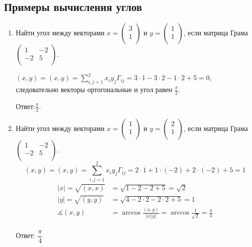 \documentclass[12pt]{article}
\begin{document}
\subsection{Примеры вычисления углов}
\begin{enumerate}
    \item Найти угол между векторами $x = \begin{pmatrix}
                  3 \\
                  1 \\
              \end{pmatrix}$ и $y= \begin{pmatrix}
                  1 \\
                  1 \\
              \end{pmatrix}$, если матрица Грама $\begin{pmatrix}
                  1  & -2 \\
                  -2 & 5  \\
              \end{pmatrix}$.

          $(x,y)=(x,y)=\sum\limits_{i,j=1}^2 x_iy_j\Gamma_{ij} = 3\cdot1 - 3\cdot2-1\cdot2+5=0$,
          следовательно векторы ортогональные и угол равен $\frac{\pi}{2}$.

          Ответ:$\frac{\pi}{2}$.
    \item Найти угол между векторами $x = \begin{pmatrix}
                  1 \\
                  1 \\
              \end{pmatrix}$ и $y= \begin{pmatrix}
                  2 \\
                  1 \\
              \end{pmatrix}$, если матрица Грама $\begin{pmatrix}
                  1  & -2 \\
                  -2 & 5  \\
              \end{pmatrix}$.
          \[
              (x,y)=(x,y)=\sum\limits_{i,j=1}^2 x_iy_j\Gamma_{ij} = 2\cdot1 + 1\cdot(-2)+2\cdot(-2)+5=1
          \]
          \[
              \begin{aligned}
                  |x|=\sqrt{(x,x)}    & =\sqrt{1-2-2+5}=\sqrt{2}                                               \\
                  |y|=\sqrt{(y,y)}    & =\sqrt{4-2\cdot2-2\cdot2+5}=1                                          \\
                  \measuredangle(x,y) & =\arccos \frac{(x,y)}{|x||y|}=\arccos \frac{1}{\sqrt{2}}=\frac{\pi}{4} \\
              \end{aligned}
          \]

          Ответ: $\dfrac{\pi}{4}$
\end{enumerate}
\end{document}
